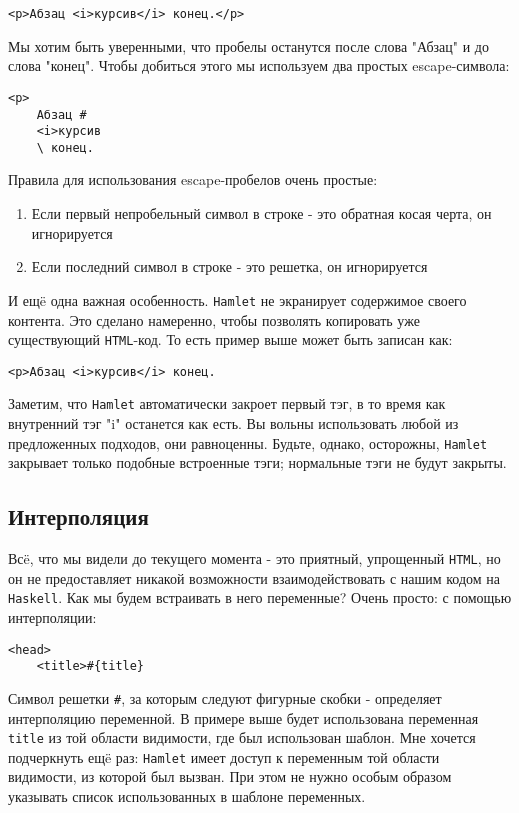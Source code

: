 \begin{lstlisting}
<p>Абзац <i>курсив</i> конец.</p>
\end{lstlisting}

Мы хотим быть уверенными, что пробелы останутся после слова "Абзац" и до слова
"конец". Чтобы добиться этого мы используем два простых escape-символа:

\begin{lstlisting}
<p>
    Абзац #
    <i>курсив
    \ конец.
\end{lstlisting}

Правила для использования escape-пробелов очень простые:
\begin{enumerate}
    \item Если первый непробельный символ в строке - это обратная косая черта,
        он игнорируется
    \item Если последний символ в строке - это решетка, он игнорируется
\end{enumerate}

И ещë одна важная особенность. \texttt{Hamlet} не экранирует содержимое своего
контента.  Это сделано намеренно, чтобы позволять копировать уже существующий
\texttt{HTML}-код.  То есть пример выше может быть записан как:
\begin{lstlisting}
<p>Абзац <i>курсив</i> конец.
\end{lstlisting}

Заметим, что \texttt{Hamlet} автоматически закроет первый тэг, в то время как
внутренний тэг "i" останется как есть. Вы вольны использовать любой из
предложенных подходов, они равноценны. Будьте, однако, осторожны,
\texttt{Hamlet} закрывает только подобные встроенные тэги; нормальные тэги не
будут закрыты.

\subsection{Интерполяция}

Всë, что мы видели до текущего момента - это приятный, упрощенный
\texttt{HTML}, но он не предоставляет никакой возможности взаимодействовать с
нашим кодом на \texttt{Haskell}.  Как мы будем встраивать в него переменные?
Очень просто: с помощью интерполяции:
\begin{lstlisting}
<head>
    <title>#{title}
\end{lstlisting}

Символ решетки \verb'#', за которым следуют фигурные скобки - определяет
интерполяцию переменной. В примере выше будет использована переменная
\lstinline!title! из той области видимости, где был использован шаблон. Мне
хочется подчеркнуть ещë раз: \texttt{Hamlet} имеет доступ к переменным той
области видимости, из которой был вызван.  При этом не нужно особым образом
указывать список использованных в шаблоне переменных.

